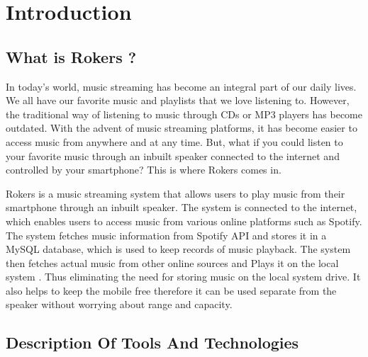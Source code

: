 \chapter{Introduction}
\section{What is Rokers ?}
In today's world, music streaming has become an integral part of our daily lives. We all have our favorite music and playlists that we love listening to. However, the traditional way of listening to music through CDs or MP3 players has become outdated. With the advent of music streaming platforms, it has become easier to access music from anywhere and at any time. But, what if you could listen to your favorite music through an inbuilt speaker connected to the internet and controlled by your smartphone? This is where Rokers comes in.

Rokers is a music streaming system that allows users to play music from their smartphone through an inbuilt speaker. The system is connected to the internet, which enables users to access music from various online platforms such as Spotify. The system fetches music information from Spotify API and stores it in a MySQL database, which is used to keep records of music playback. The system then fetches actual music from other online sources and Plays it on the local system . Thus eliminating the need for storing music on the local system drive. It also helps to keep the mobile free therefore it can be used separate from the speaker without worrying about range and capacity.

\section{Description Of Tools And Technologies}

